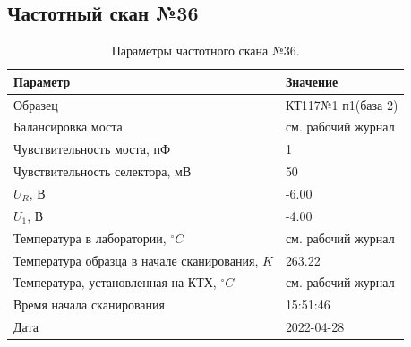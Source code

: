 \subsection{Частотный скан №36}
\begin{table}[!ht]
    \centering
    \caption{Параметры частотного скана №36.}
    \begin{tabular}{|l|l|}
        \hline
        Параметр                                       & Значение                  \\ \hline
        Образец                                        & КТ117№1 п1(база 2)        \\ \hline
        Балансировка моста                             & см. рабочий журнал        \\ \hline
        Чувствительность моста, пФ                     & 1                         \\ \hline
        Чувствительность селектора, мВ                 & 50                        \\ \hline
        $U_R$, В                                       & -6.00                     \\ \hline
        $U_1$, В                                       & -4.00                     \\ \hline
        Температура в лаборатории, $^\circ C$          & см. рабочий журнал        \\ \hline
        Температура образца в начале сканирования, $K$ & 263.22                    \\ \hline
        Температура, установленная на КТХ, $^\circ C$  & см. рабочий журнал        \\ \hline
        Время начала сканирования                      & 15:51:46                  \\ \hline
        Дата                                           & 2022-04-28                \\ \hline
    \end{tabular}
    \label{table:frequency_scan_36}
\end{table}

